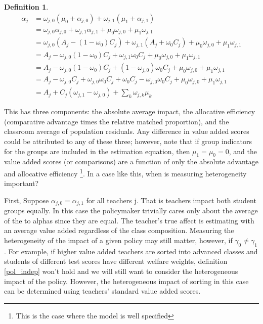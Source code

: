 \documentclass[12pt]{article}
\theoremstyle{definition}
\theoremstyle{definition}
\theoremstyle{definition}
\theoremstyle{definition}
\newtheorem{definition}{Definition}
\begin{document}
    \begin{definition}
    \label{hetero_decomp}
    \begin{align*}
        \alpha_j  &= \omega_{j,0}(\mu_0 +\alpha_{j,0}) + \omega_{j,1}(\mu_1 +\alpha_{j,1})  \\
                  & =  \omega_{j,0}\alpha_{j,0} + \omega_{j,1}\alpha_{j,1}   +\mu_0 \omega_{j,0} + \mu_1 \omega_{j,1}  \\
                  & =  \omega_{j,0}(A_j -(1-\omega_{0})C_j) + \omega_{j,1}(A_j +\omega_{0}C_j)  +\mu_0 \omega_{j,0} + \mu_1 \omega_{j,1} \\
                  & =  A_j   - \omega_{j,0} (1-\omega_{0})C_j + \omega_{j,1}\omega_{0}C_j +\mu_0 \omega_{j,0} + \mu_1 \omega_{j,1} \\
                  & =  A_j   - \omega_{j,0} (1-\omega_{0})C_j + (1-\omega_{j,0})\omega_{0}C_j +\mu_0 \omega_{j,0} + \mu_1 \omega_{j,1} \\
                  & =  A_j   - \omega_{j,0} C_j +\omega_{j,0}\omega_{0}C_j + \omega_{0}C_j -\omega_{j,0}\omega_{0}C_j +\mu_0 \omega_{j,0} + \mu_1 \omega_{j,1} \\
                  & =  A_j  + C_j  ( \omega_{j,1} - \omega_{j,0} ) + \sum_k  \omega_{j,k} \mu_k
    \end{align*}
    \end{definition}

    
    This has three components: the absolute average impact, the allocative efficiency (comparative advantage times the relative matched proportion), and the classroom average of population residuals. Any difference in value added scores could be attributed to any of these three; however, note that if group indicators for the groups are included in the estimation equation, then $\mu_1 = \mu_0 = 0$, and the value added scores (or comparisons) are a function of only the absolute advantage and allocative efficiency \footnote{This is the case where the model is well specified}. In a case like this, when is measuring heterogeneity important? 
    
     First, Suppose $\alpha_{j,0} = \alpha_{j,1}$ for all teachers j. That is teachers impact both student groups equally. In this case the policymaker trivially cares only about the average of the to alphas since they are equal. The teacher's true affect is estimating with an average value added regardless of the class composition. Measuring the heterogeneity of the impact of a given policy may still matter, however, if $\gamma_0 \neq \gamma_1$. For example, if higher value added teachers are sorted into advanced classes and students of different test scores have different welfare weights, definition \ref{pol_indep} won't hold and we will still want to consider the heterogeneous impact of the policy. However, the heterogeneous impact of sorting in this case can be determined using teachers' standard value added scores.
     
\end{document}
